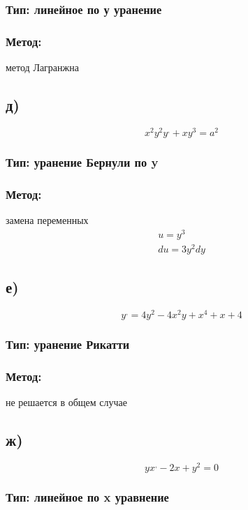 \documentclass[a4paper]{article}
\begin{document}
\subsubsection*{Тип: линейное по у уранение }

\subsubsection*{Метод:}
метод Лагранжна

\subsection*{д)}
\begin{equation*}
x^2y^2y^, + xy^3 = a^2
\end{equation*}
\subsubsection*{Тип: уранение Бернули по y}

\subsubsection*{Метод:}
замена переменных
\begin{gather*}
u=y^3\\
du=3y^2dy
\end{gather*}

\subsection*{е)}
\begin{equation*}
y^, = 4y^2 - 4x^2y + x^4 + x + 4
\end{equation*}
\subsubsection*{Тип: уранение Рикатти}

\subsubsection*{Метод:}
не решается в общем случае

\subsection*{ж)}
\begin{equation*}
y x^, - 2x + y^2 = 0
\end{equation*}
\subsubsection*{Тип: линейное по x уравнение }
\end{document}

